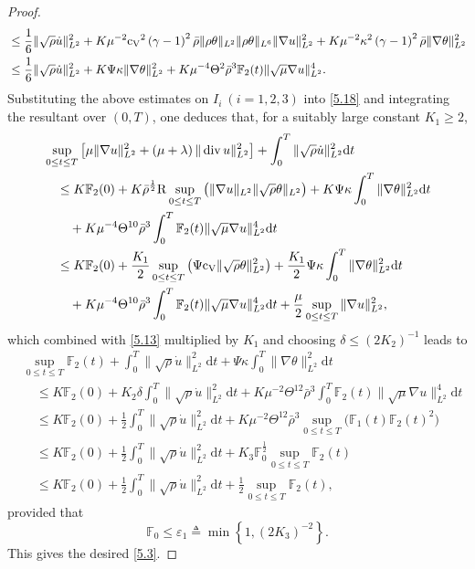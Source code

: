 \documentclass[11pt]{article}
\DeclareMathOperator{\divv}{div}
\begin{document}
\begin{proof}
\begin{align*}
& \leq \frac{1}{6} \|\sqrt \rho \dot{u}\|_{L^2}^2 + K \mu^{-2} {\rm c_V}^2 \left( \gamma - 1\right)^2 \bar{\rho} \|\rho \theta \|_{L^2} \|\rho \theta \|_{L^6} \|\nabla u\|_{L^2}^2 + K \mu^{-2} \kappa^2 \left( \gamma - 1\right)^2 \bar{\rho} \|\nabla \theta \|_{L^2}^2\\
& \leq \frac{1}{6} \|\sqrt \rho \dot{u}\|_{L^2}^2 + K \Psi \kappa \|\nabla \theta \|_{L^2}^2 + K \mu^{-4} \Theta^2 \bar{\rho}^3 \mathbb{F}_2 (t) \|\sqrt{\mu}\nabla u\|_{L^2}^4.
\end{align*}
Substituting the above estimates on $I_i\ (i=1,2,3)$ into \eqref{5.18} and integrating the resultant over $(0,T)$, one deduces that, for a suitably large constant $K_1 \geq 2$,
\begin{align*}
& \sup_{0 \leq t \leq T} \left[\mu \|\nabla u\|_{L^2}^2 + \left(\mu + \lambda \right) \|\divv u\|_{L^2}^2 \right] + \int^T_0 \|\sqrt{\rho} \dot{u}\|_{L^2}^2 \mathrm{d} t\\
& \quad \leq K \mathbb{F}_2 (0) + K \bar{\rho}^{\frac{1}{2}} {\rm R} \sup_{0 \leq t \leq T}\big(\|\nabla u\|_{L^2} \|\sqrt{\rho} \theta \|_{L^2}\big)+ K \Psi \kappa \int^T_0 \|\nabla \theta \|_{L^2}^2 \mathrm{d} t \\
& \qquad + K \mu^{-4} \Theta^{10} \bar{\rho}^3 \int^T_0 \mathbb{F}_2 (t) \|\sqrt{\mu}\nabla u\|_{L^2}^4 \mathrm{d} t\\
& \quad \leq K \mathbb{F}_2 (0) + \frac{K_1}{2} \sup_{0 \leq t \leq T} \left( \Psi {\rm c_V} \|\sqrt{\rho} \theta \|_{L^2}^2 \right) + \frac{K_1}{2} \Psi \kappa \int^T_0 \|\nabla \theta \|_{L^2}^2 \mathrm{d} t\\
& \qquad + K \mu^{-4} \Theta^{10} \bar{\rho}^3 \int^T_0 \mathbb{F}_2 (t) \|\sqrt{\mu}\nabla u\|_{L^2}^4 \mathrm{d} t+ \frac{\mu}{2} \sup_{0 \leq t \leq T}\|\nabla u\|_{L^2}^2,
\end{align*}
which combined with \eqref{5.13} multiplied by $K_1$ and choosing $\delta \leq (2 K_2)^{-1}$ leads to
\begin{align*}
& \sup_{0 \leq t \leq T} \mathbb{F}_2 (t) + \int^T_0 \|\sqrt{\rho} \dot{u}\|_{L^2}^2 \mathrm{d} t + \Psi \kappa \int^T_0 \|\nabla \theta \|_{L^2}^2 \mathrm{d} t\\
& \quad \leq K \mathbb{F}_2 (0) +  K_2 \delta \int^T_0 \|\sqrt{\rho} \dot{u}\|_{L^2}^2 \mathrm{d} t + K \mu^{-2} \Theta^{12} \bar{\rho}^3 \int^T_0 \mathbb{F}_2 (t) \|\sqrt{\mu}\nabla u\|_{L^2}^4 \mathrm{d} t\\
& \quad \leq K \mathbb{F}_2 (0) + \frac{1}{2} \int^T_0 \|\sqrt{\rho} \dot{u}\|_{L^2}^2 \mathrm{d} t + K \mu^{-2} \Theta^{12} \bar{\rho}^3 \sup_{0 \leq t \leq T}\big(\mathbb{F}_1 (t) \mathbb{F}_2 (t)^2\big)\\
& \quad \leq K \mathbb{F}_2 (0) + \frac{1}{2} \int^T_0 \|\sqrt{\rho} \dot{u}\|_{L^2}^2 \mathrm{d} t + K_3 \mathbb{F}_0^{\frac{1}{2}} \sup_{0 \leq t \leq T} \mathbb{F}_2 (t)\\
& \quad \leq K \mathbb{F}_2 (0) + \frac{1}{2} \int^T_0 \|\sqrt{\rho} \dot{u}\|_{L^2}^2 \mathrm{d} t + \frac{1}{2} \sup_{0 \leq t \leq T} \mathbb{F}_2 (t),
\end{align*}
provided that
$$
\mathbb{F}_0 \leq \varepsilon_1 \triangleq \min \left\{1, (2 K_3)^{-2}\right\}.
$$
This gives the desired \eqref{5.3}.


\end{proof}
\end{document}
